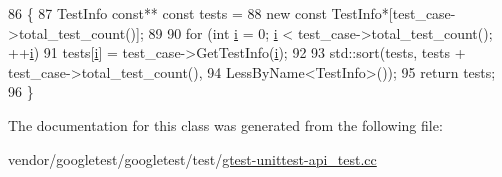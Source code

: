 \begin{DoxyCode}
86                                                                     \{
87     TestInfo \textcolor{keyword}{const}** \textcolor{keyword}{const} tests =
88         \textcolor{keyword}{new} \textcolor{keyword}{const} TestInfo*[test\_case->total\_test\_count()];
89 
90     \textcolor{keywordflow}{for} (\textcolor{keywordtype}{int} \hyperlink{gtest__output__test__golden__lin_8txt_a7e98b8a17c0aad30ba64d47b74e2a6c1}{i} = 0; \hyperlink{gtest__output__test__golden__lin_8txt_a7e98b8a17c0aad30ba64d47b74e2a6c1}{i} < test\_case->total\_test\_count(); ++\hyperlink{gtest__output__test__golden__lin_8txt_a7e98b8a17c0aad30ba64d47b74e2a6c1}{i})
91       tests[\hyperlink{gtest__output__test__golden__lin_8txt_a7e98b8a17c0aad30ba64d47b74e2a6c1}{i}] = test\_case->GetTestInfo(\hyperlink{gtest__output__test__golden__lin_8txt_a7e98b8a17c0aad30ba64d47b74e2a6c1}{i});
92 
93     std::sort(tests, tests + test\_case->total\_test\_count(),
94               LessByName<TestInfo>());
95     \textcolor{keywordflow}{return} tests;
96   \}
\end{DoxyCode}


The documentation for this class was generated from the following file\+:\begin{DoxyCompactItemize}
\item 
vendor/googletest/googletest/test/\hyperlink{gtest-unittest-api__test_8cc}{gtest-\/unittest-\/api\+\_\+test.\+cc}\end{DoxyCompactItemize}
